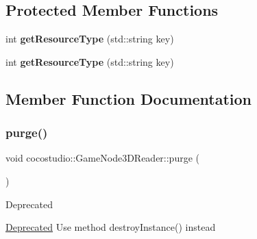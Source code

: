 \subsection*{Protected Member Functions}
\begin{DoxyCompactItemize}
\item 
\mbox{\label{classcocostudio_1_1GameNode3DReader_a8a350d7ae0aa29ea496bf33d5df0c77d}} 
int {\bfseries get\+Resource\+Type} (std\+::string key)
\item 
\mbox{\label{classcocostudio_1_1GameNode3DReader_a8a350d7ae0aa29ea496bf33d5df0c77d}} 
int {\bfseries get\+Resource\+Type} (std\+::string key)
\end{DoxyCompactItemize}


\subsection{Member Function Documentation}
\mbox{\label{classcocostudio_1_1GameNode3DReader_a3d35fe546c6f1b8293d4d61a020077c1}} 
\subsubsection{\texorpdfstring{purge()}{purge()}\hspace{0.1cm}{\footnotesize\ttfamily [1/2]}}
{\footnotesize\ttfamily void cocostudio\+::\+Game\+Node3\+D\+Reader\+::purge (\begin{DoxyParamCaption}{ }\end{DoxyParamCaption})\hspace{0.3cm}{\ttfamily [static]}}

\begin{DoxyRefDesc}{Deprecated}
\item[\hyperlink{deprecated__deprecated000088}{Deprecated}]Use method destroy\+Instance() instead \end{DoxyRefDesc}
\mbox{\label{classcocostudio_1_1GameNode3DReader_a30a866505d94a69961443e6803bb2c0e}} 
